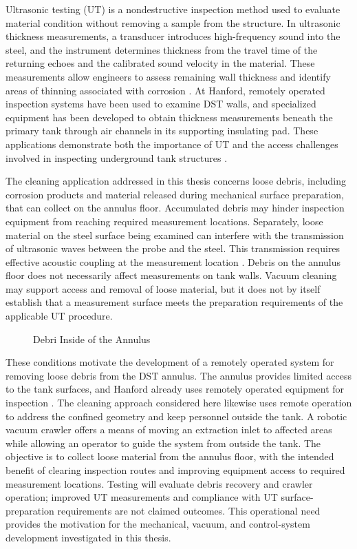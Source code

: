 Ultrasonic testing (UT) is a nondestructive inspection method used to evaluate material condition without removing a sample from the structure. In ultrasonic thickness measurements, a transducer introduces high-frequency sound into the steel, and the instrument determines thickness from the travel time of the returning echoes and the calibrated sound velocity in the material. These measurements allow engineers to assess remaining wall thickness and identify areas of thinning associated with corrosion \citep{evidentThicknessGauging}. At Hanford, remotely operated inspection systems have been used to examine DST walls, and specialized equipment has been developed to obtain thickness measurements beneath the primary tank through air channels in its supporting insulating pad. These applications demonstrate both the importance of UT and the access challenges involved in inspecting underground tank structures \citep{doe2020HanfordRoboticInspection}.


The cleaning application addressed in this thesis concerns loose debris, including corrosion products and material released during mechanical surface preparation, that can collect on the annulus floor. Accumulated debris may hinder inspection equipment from reaching required measurement locations. Separately, loose material on the steel surface being examined can interfere with the transmission of ultrasonic waves between the probe and the steel. This transmission requires effective acoustic coupling at the measurement location \citep{evidentUltrasonicSurfaceFactors}. Debris on the annulus floor does not necessarily affect measurements on tank walls. Vacuum cleaning may support access and removal of loose material, but it does not by itself establish that a measurement surface meets the preparation requirements of the applicable UT procedure.

\begin{figure}[H]
\centering
{}
\caption{Debri Inside of the Annulus}
\label{fig:Debri Inside of the Annulus}
\end{figure}

These conditions motivate the development of a remotely operated system for removing loose debris from the DST annulus. The annulus provides limited access to the tank surfaces, and Hanford already uses remotely operated equipment for inspection \citep{doe2024DoubleShellTanks,doe2020HanfordRoboticInspection}. The cleaning approach considered here likewise uses remote operation to address the confined geometry and keep personnel outside the tank. A robotic vacuum crawler offers a means of moving an extraction inlet to affected areas while allowing an operator to guide the system from outside the tank. The objective is to collect loose material from the annulus floor, with the intended benefit of clearing inspection routes and improving equipment access to required measurement locations. Testing will evaluate debris recovery and crawler operation; improved UT measurements and compliance with UT surface-preparation requirements are not claimed outcomes. This operational need provides the motivation for the mechanical, vacuum, and control-system development investigated in this thesis.



